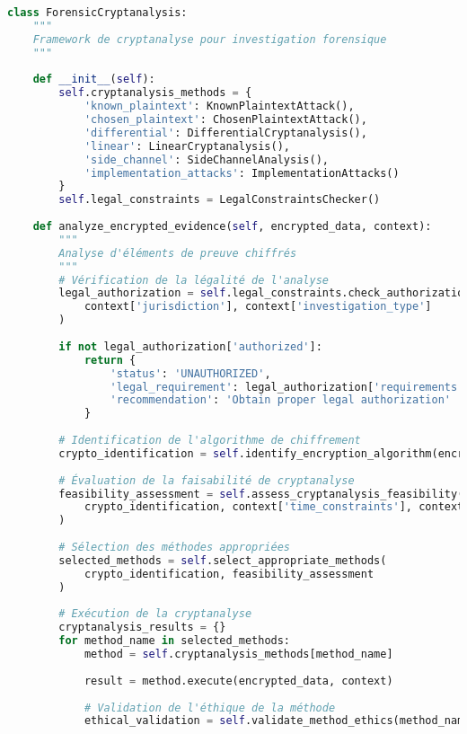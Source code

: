 \begin{lstlisting}[language=Python, caption=Framework de cryptanalyse forensique]
class ForensicCryptanalysis:
    """
    Framework de cryptanalyse pour investigation forensique
    """
    
    def __init__(self):
        self.cryptanalysis_methods = {
            'known_plaintext': KnownPlaintextAttack(),
            'chosen_plaintext': ChosenPlaintextAttack(),
            'differential': DifferentialCryptanalysis(),
            'linear': LinearCryptanalysis(),
            'side_channel': SideChannelAnalysis(),
            'implementation_attacks': ImplementationAttacks()
        }
        self.legal_constraints = LegalConstraintsChecker()
        
    def analyze_encrypted_evidence(self, encrypted_data, context):
        """
        Analyse d'éléments de preuve chiffrés
        """
        # Vérification de la légalité de l'analyse
        legal_authorization = self.legal_constraints.check_authorization(
            context['jurisdiction'], context['investigation_type']
        )
        
        if not legal_authorization['authorized']:
            return {
                'status': 'UNAUTHORIZED',
                'legal_requirement': legal_authorization['requirements'],
                'recommendation': 'Obtain proper legal authorization'
            }
            
        # Identification de l'algorithme de chiffrement
        crypto_identification = self.identify_encryption_algorithm(encrypted_data)
        
        # Évaluation de la faisabilité de cryptanalyse
        feasibility_assessment = self.assess_cryptanalysis_feasibility(
            crypto_identification, context['time_constraints'], context['resources']
        )
        
        # Sélection des méthodes appropriées
        selected_methods = self.select_appropriate_methods(
            crypto_identification, feasibility_assessment
        )
        
        # Exécution de la cryptanalyse
        cryptanalysis_results = {}
        for method_name in selected_methods:
            method = self.cryptanalysis_methods[method_name]
            
            result = method.execute(encrypted_data, context)
            
            # Validation de l'éthique de la méthode
            ethical_validation = self.validate_method_ethics(method_name, context)
            

\end{lstlisting}

